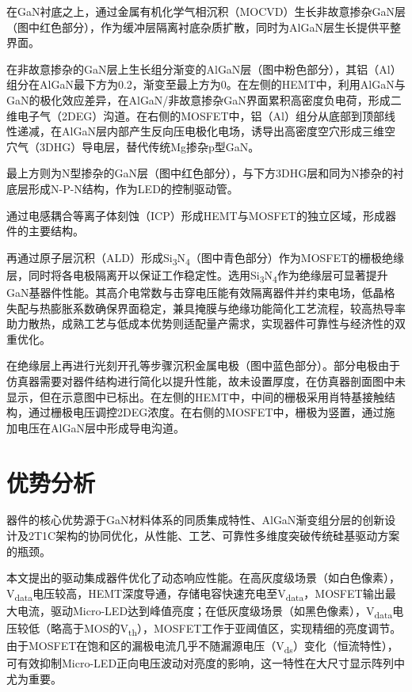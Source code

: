 \documentclass[
    oneside,                %
    fontset = win, %
  ]{njuthesis}
\begin{document}
在GaN衬底之上，通过金属有机化学气相沉积（MOCVD）生长非故意掺杂GaN层（图中红色部分），作为缓冲层隔离衬底杂质扩散，同时为AlGaN层生长提供平整界面。

在非故意掺杂的GaN层上生长组分渐变的AlGaN层（图中粉色部分），其铝（Al）组分在AlGaN最下方为0.2，渐变至最上方为0。在左侧的HEMT中，利用AlGaN与GaN的极化效应差异，在AlGaN/非故意掺杂GaN界面累积高密度负电荷，形成二维电子气（2DEG）沟道。在右侧的MOSFET中，铝（Al）组分从底部到顶部线性递减，在AlGaN层内部产生反向压电极化电场，诱导出高密度空穴形成三维空穴气（3DHG）导电层，替代传统Mg掺杂p型GaN。

最上方则为N型掺杂的GaN层（图中红色部分），与下方3DHG层和同为N掺杂的衬底层形成N-P-N结构，作为LED的控制驱动管。

通过电感耦合等离子体刻蚀（ICP）形成HEMT与MOSFET的独立区域，形成器件的主要结构。

再通过原子层沉积（ALD）形成Si\textsubscript{3}N\textsubscript{4}（图中青色部分）作为MOSFET的栅极绝缘层，同时将各电极隔离开以保证工作稳定性。选用Si\textsubscript{3}N\textsubscript{4}作为绝缘层可显著提升GaN基器件性能。其高介电常数与击穿电压能有效隔离器件并约束电场，低晶格失配与热膨胀系数确保界面稳定，兼具掩膜与绝缘功能简化工艺流程，较高热导率助力散热，成熟工艺与低成本优势则适配量产需求，实现器件可靠性与经济性的双重优化。

在绝缘层上再进行光刻开孔等步骤沉积金属电极（图中蓝色部分）。部分电极由于仿真器需要对器件结构进行简化以提升性能，故未设置厚度，在仿真器剖面图中未显示，但在示意图中已标出。在左侧的HEMT中，中间的栅极采用肖特基接触结构，通过栅极电压调控2DEG浓度。在右侧的MOSFET中，栅极为竖置，通过施加电压在AlGaN层中形成导电沟道。

\section{优势分析}

器件的核心优势源于GaN材料体系的同质集成特性、AlGaN渐变组分层的创新设计及2T1C架构的协同优化，从性能、工艺、可靠性多维度突破传统硅基驱动方案的瓶颈。

本文提出的驱动集成器件优化了动态响应性能。在高灰度级场景（如白色像素），V\textsubscript{data}电压较高，HEMT深度导通，存储电容快速充电至V\textsubscript{data}，MOSFET输出最大电流，驱动Micro-LED达到峰值亮度；在低灰度级场景（如黑色像素），V\textsubscript{data}电压较低（略高于MOS的V\textsubscript{th}），MOSFET工作于亚阈值区，实现精细的亮度调节。由于MOSFET在饱和区的漏极电流几乎不随漏源电压（V\textsubscript{ds}）变化（恒流特性），可有效抑制Micro-LED正向电压波动对亮度的影响，这一特性在大尺寸显示阵列中尤为重要。
\end{document}

